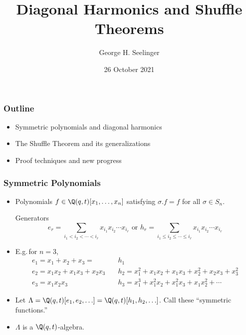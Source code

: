 \documentclass{beamer}
\title[Shuffle Theorems]{Diagonal Harmonics and Shuffle Theorems} %
\author[George H. Seelinger]{George H. Seelinger} %
\institute[UMich] %
{
  \medskip
\textit{ghseeli@umich.edu}\\ %
\medskip
  on joint work with Jonah Blasiak, Mark Haiman, Jennifer Morse, and Anna
  Pun\\
  arXiv:2102.07931\\
  \medskip
OIST Representation Theory Seminar
}
\date{26 October 2021} %
\DeclareMathOperator{\Gr}{Gr}
\newcommand{\sym}{\Lambda}
\newcounter{c}
\begin{document}
\begin{frame}
 \titlepage 
\end{frame}
\begin{frame}
  \frametitle{Outline}
  \begin{itemize}
  \item Symmetric polynomials and diagonal harmonics 
  \item The Shuffle Theorem and its generalizations
  \item Proof techniques and new progress
  \end{itemize}
\end{frame}
\begin{frame}
  \frametitle{Symmetric Polynomials}
  \begin{itemize}
  \item Polynomials \(f \in \Q(q,t)[x_1,\ldots,x_n]\) satisfying \(\sigma.f
    = f\) for all \(\sigma \in S_n\).\pause
    \begin{block}{Generators}
    \[
      e_r =
      \sum_{i_1 < i_2 < \cdots < i_r} x_{i_1} x_{i_2} \cdots x_{i_r}
      \text { or }
      h_r = 
      \sum_{i_1 \leq i_2 \leq \cdots \leq i_r} x_{i_1} x_{i_2} \cdots x_{i_r}
    \]\pause 
  \end{block}
    \item E.g.\,for \(n=3\),
    \begin{align*}
      e_1 = x_1 + x_2 + x_3 = & h_1  \\
      e_2 = x_1 x_2 + x_1 x_3 + x_2 x_3 \quad & h_2 = x_1^2 + x_1 x_2 + x_1
                                          x_3 + x_2^2 +  x_2 x_3 +x_3^2  \\
      e_3 = x_1 x_2 x_3 \quad & h_3 = x_1^3 + x_1^2 x_2 + x_1^2 x_3 + x_1
                          x_2^2 + \cdots
    \end{align*} \pause
    \item Let \(\sym =
      \Q(q,t)[e_1,e_2,\ldots] = \Q(q,t)[h_1,h_2,\ldots]\). Call these
      ``symmetric functions.''\pause
    \item \(\sym\) is a \(\Q(q,t)\)-algebra.
  \end{itemize}
\end{frame}
\end{document}
